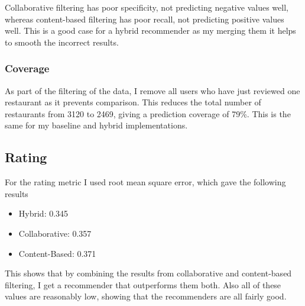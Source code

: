 \documentclass[conference]{IEEEtran}
\begin{document}
\begin{flushleft}
\end{flushleft}


Collaborative filtering has poor specificity, not predicting negative values well, whereas content-based filtering has poor recall, not predicting positive values well. This is a good case for a hybrid recommender as my merging them it helps to smooth the incorrect results.

\subsubsection{Coverage}

As part of the filtering of the data, I remove all users who have just reviewed one restaurant as it prevents comparison. This reduces the total number of restaurants from 3120 to 2469, giving a prediction coverage of 79\%. This is the same for my baseline and hybrid implementations.

\subsection{Rating}

For the rating metric I used root mean square error, which gave the following results
\begin{itemize}
	\item Hybrid: 0.345
	\item Collaborative: 0.357
	\item Content-Based: 0.371
\end{itemize}

This shows that by combining the results from collaborative and content-based filtering, I get a recommender that outperforms them both. Also all of these values are reasonably low, showing that the recommenders are all fairly good.
\end{document}
